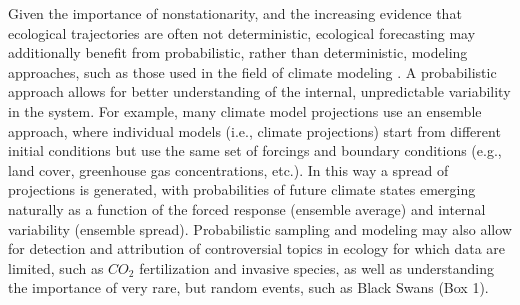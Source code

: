 \documentclass[11pt,a4paper,oneside]{article}
\begin{document}
Given the importance of nonstationarity, and the increasing evidence that ecological trajectories are often not deterministic, ecological forecasting may additionally benefit from probabilistic, rather than deterministic, modeling approaches, such as those used in the field of climate modeling \citep{Tebaldi2007}. A probabilistic approach allows for better understanding of the internal, unpredictable variability in the system. For example, many climate model projections use an ensemble approach, where individual models (i.e., climate projections) start from different initial conditions but use the same set of forcings and boundary conditions (e.g., land cover, greenhouse gas concentrations, etc.). In this way a spread of projections is generated, with probabilities of future climate states emerging naturally as a function of the forced response (ensemble average) and internal variability (ensemble spread). Probabilistic sampling and modeling may also allow for detection and attribution of controversial topics in ecology for which data are limited, such as $CO_{2}$ fertilization and invasive species, as well as understanding the importance of very rare, but random events, such as Black Swans (Box 1).\\

\\
\end{document}
